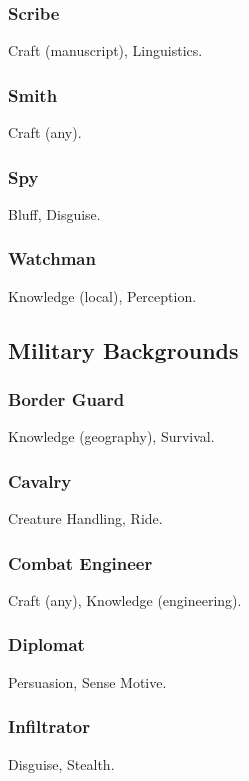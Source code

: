 \subsubsection{Scribe}
 Craft (manuscript), Linguistics.

\subsubsection{Smith}
 Craft (any).

\subsubsection{Spy}
 Bluff, Disguise.

\subsubsection{Watchman}
 Knowledge (local), Perception.

\subsection{Military Backgrounds}

\subsubsection{Border Guard}
 Knowledge (geography), Survival.

\subsubsection{Cavalry}
 Creature Handling, Ride.

\subsubsection{Combat Engineer}
 Craft (any), Knowledge (engineering).

\subsubsection{Diplomat}
 Persuasion, Sense Motive.

\subsubsection{Infiltrator}
 Disguise, Stealth.

